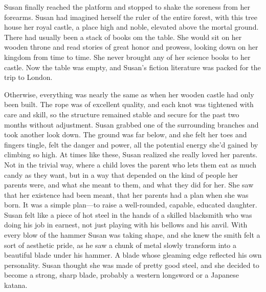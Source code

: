 \documentclass[openany, oneside]{book}
\begin{document}
Susan finally reached the platform and stopped to shake the soreness from her forearms.
Susan had imagined herself the ruler of the entire forest, with this tree house her royal castle, a place high and noble, elevated above the mortal ground.
There had usually been a stack of books om the table. She would sit on her wooden throne and read stories of great honor and prowess, looking down on her kingdom from time to time.
She never brought any of her science books to her castle.
Now the table was empty, and Susan's fiction literature was packed for the trip to London.

Otherwise, everything was nearly the same as when her wooden castle had only been built.
The rope was of excellent quality, and each knot was tightened with care and skill, so the structure remained stable and secure for the past two months without adjustment.
Susan grabbed one of the surrounding branches and took another look down.
The ground was far below, and she felt her toes and fingers tingle, felt the danger and power, all the potential energy she'd gained by climbing so high.
At times like these, Susan realized she really loved her parents.
Not in the trivial way, where a child loves the parent who lets them eat as much candy as they want, but in a way that depended on the kind of people her parents were, and what she meant to them, and what they did for her.
She saw that her existence had been meant, that her parents had a plan when she was born.
It was a simple plan---to raise a well-rounded, capable, educated daughter.
Susan felt like a piece of hot steel in the hands of a skilled blacksmith who was doing his job in earnest, not just playing with his bellows and his anvil.
With every blow of the hammer Susan was taking shape, and she knew the smith felt a sort of aesthetic pride, as he saw a chunk of metal slowly transform into a beautiful blade under his hammer.
A blade whose gleaming edge reflected his own personality.
Susan thought she was made of pretty good steel, and she decided to become a strong, sharp blade, probably a western longsword or a Japanese katana.
\end{document}
